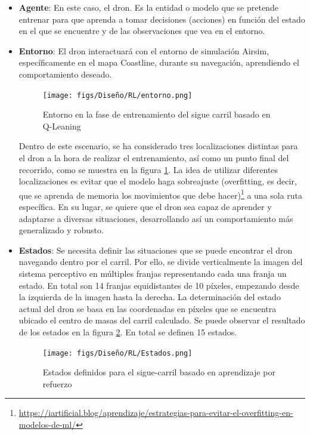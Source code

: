   \begin{itemize} 
    \item \textbf{Agente}: En este caso, el dron. Es la entidad o modelo que se pretende entrenar para que aprenda a tomar decisiones (acciones) en función del estado en el que se 
    encuentre y de las observaciones que vea en el entorno. 
    
    \item \textbf{Entorno}: El dron interactuará con el entorno de simulación Airsim, específicamente en el mapa Coastline, durante su navegación, aprendiendo el comportamiento deseado.

    \begin{figure} [H]
      \begin{center}
        \texttt{[image: figs/Diseño/RL/entorno.png]}
      \end{center}
      \caption{Entorno en la fase de entrenamiento del sigue carril basado en Q-Leaning}
      \label{fig:Entorno}
    \end{figure}

    Dentro de este escenario, se ha considerado tres localizaciones distintas para el dron a la hora de realizar el entrenamiento, así como un punto final del recorrido, como se muestra en la figura
    \ref{fig:Entorno}. La idea de utilizar diferentes localizaciones es evitar que el modelo haga sobreajuste (overfitting, es decir, que se aprenda de memoria los movimientos que debe hacer)\footnote{\url{https://iartificial.blog/aprendizaje/estrategias-para-evitar-el-overfitting-en-modelos-de-ml/}} 
    a una sola ruta específica. En su lugar, se quiere que el dron 
    sea capaz de aprender y adaptarse a diversas situaciones, desarrollando así un comportamiento más generalizado y robusto.
    
    \item \textbf{Estados}: Se necesita definir las situaciones que se puede encontrar el dron navegando dentro  por el carril. Por ello, se divide verticalmente la imagen del sistema perceptivo
    en múltiples franjas representando cada una franja un estado. En total son 14 franjas equidistantes de 10 píxeles, empezando desde la izquierda de la imagen hasta la derecha. La determinación
    del estado actual del dron se basa en las coordenadas en píxeles que se encuentra ubicado el centro de masas del carril calculado. Se puede observar el 
    resultado de los estados en la figura \ref{fig:Estados}. En total se definen 15 estados.
    
    \begin{figure} [H]
      \begin{center}
        \texttt{[image: figs/Diseño/RL/Estados.png]}
      \end{center}
      \caption{Estados definidos para el sigue-carril basado en aprendizaje por refuerzo}
      \label{fig:Estados}
    \end{figure}


\end{itemize}
